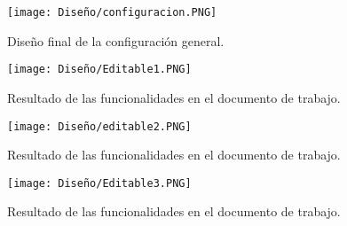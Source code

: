  \begin{figure}[ht!]
  \centering
  \texttt{[image: Diseño/configuracion.PNG]}
  \caption{Diseño final de la configuración general.}
  \label{configu}
\end{figure}





\begin{figure}[ht!]
  \centering
  \texttt{[image: Diseño/Editable1.PNG]}
  \caption{Resultado de las funcionalidades en el documento de trabajo.}
  \label{editable1}
\end{figure}


\begin{figure}[ht!]
  \centering
  \texttt{[image: Diseño/editable2.PNG]}
  \caption{Resultado de las funcionalidades en el documento de trabajo.}
  \label{editable2}
\end{figure}

\begin{figure}[ht!]
  \centering
  \texttt{[image: Diseño/Editable3.PNG]}
  \caption{Resultado de las funcionalidades en el documento de trabajo.}
  \label{editable3}
\end{figure}
